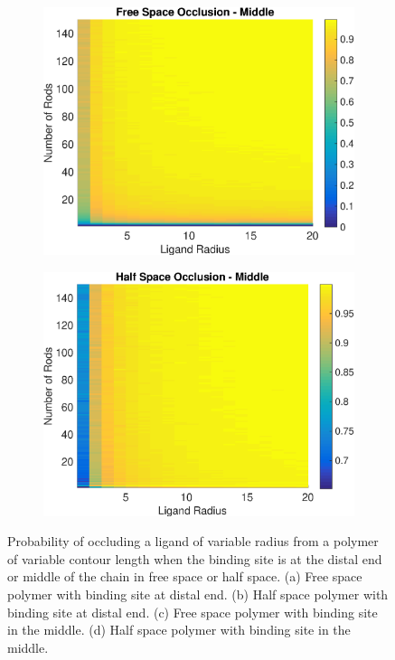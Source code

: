 \documentclass[../../AdvancementSummary.tex]{subfiles}
\begin{document}
\begin{figure}[H]
\begin{center}
\begin{subfigure}{0.4\linewidth}
\includegraphics[width=\linewidth]{ResultsFigures/General/OcclusionVSNVSRFreeMid.eps}
\caption{}
\end{subfigure}
\begin{subfigure}{0.4\linewidth}
\includegraphics[width=\linewidth]{ResultsFigures/General/OcclusionVSNVSRHalfMid.eps}
\caption{}
\end{subfigure}
\caption{Probability of occluding a ligand of variable radius from a polymer of variable contour length when the binding site is at the distal end or middle of the chain in free space or half space. (a) Free space polymer with binding site at distal end. (b) Half space polymer with binding site at distal end. (c) Free space polymer with binding site in the middle. (d) Half space polymer with binding site in the middle.\label{fig: OcclusionVSNVSR}}
\end{center}
\end{figure}
\end{document}
